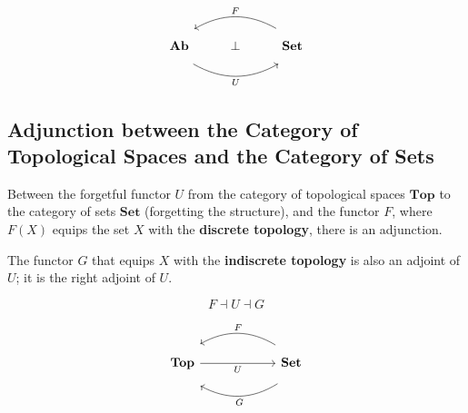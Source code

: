 \documentclass[uplatex,a4j,12pt,dvipdfmx]{jsarticle}
\begin{document}
\[
	\begin{tikzcd}
		\mathbf{Ab} \arrow[rr, "U"', bend right, shift right=3] & \bot & \mathbf{Set} \arrow[ll, "F"', bend right, shift right=3]
	\end{tikzcd}
\]



\subsection{Adjunction between the Category of Topological Spaces and the Category of Sets}

Between the forgetful functor $U$ from the category of topological spaces $\mathbf{Top}$ to the category of sets $\mathbf{Set}$ (forgetting the structure),
and the functor $F$, where $F(X)$ equips the set $X$ with the \textbf{discrete topology}, there is an adjunction.

The functor $G$ that equips $X$ with the \textbf{indiscrete topology} is also an adjoint of $U$; it is the right adjoint of $U$.

$$
	F \dashv U \dashv G
$$

\[
	\begin{tikzcd}
		\mathbf{Top} \arrow[rr, "U"'] &  & \mathbf{Set} \arrow[ll, "F"', bend right, shift right=3] \arrow[ll, "G", bend left, shift left=4]
	\end{tikzcd}
\]
\end{document}
